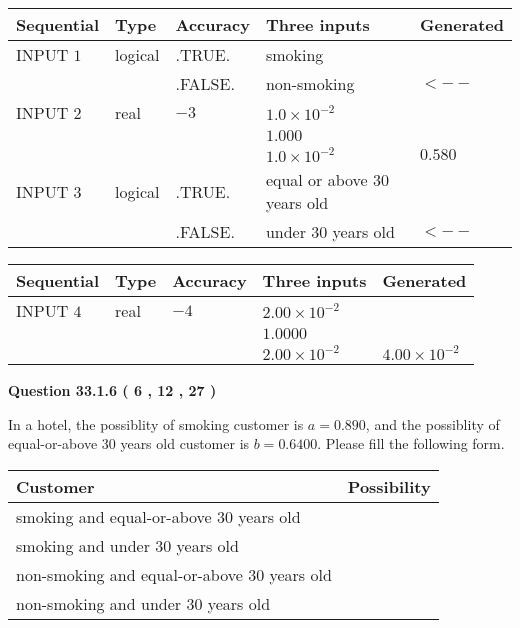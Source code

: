 \documentclass[12pt]{article}
\begin{document}
   
  
  
\noindent\begin{tabular}{|l|l|l|l|l|}
\hline
 Sequential & Type & Accuracy & Three inputs & Generated \\ 
\hline
 
 
  INPUT $            1 $ & logical & .TRUE. & 
 smoking & 
  \\
  & & .FALSE. & 
  non-smoking & 
  $ <-- $ 
 \\  \hline  
 
 
  INPUT $            2 $ & real & $           -3  $ & $
 1.0 \times 10^{-2}
  $ & \\
  & & &  $
 1.000
  $ & \\
  & & &  $
 1.0 \times 10^{-2}
 $ & $ 0.580 $ 
 \\  \hline  
 
 
  INPUT $            3 $ & logical & .TRUE. & 
 equal or above 30 years old & 
  \\
  & & .FALSE. & 
  under 30 years old & 
  $ <-- $ 
 \\  \hline  
 \end{tabular}
   
   
  
  
\noindent\begin{tabular}{|l|l|l|l|l|}
\hline
 Sequential & Type & Accuracy & Three inputs & Generated \\ 
\hline
 
 
  INPUT $            4 $ & real & $           -4  $ & $
 2.00 \times 10^{-2}
  $ & \\
  & & &  $
 1.0000
  $ & \\
  & & &  $
 2.00 \times 10^{-2}
 $ & $ 4.00 \times 10^{-2} $ 
 \\  \hline  
 \end{tabular}
   
   
  
\vspace{0.2in}
  
{\textbf{\Large{Question
33.1.6 
 (           6 ,          12 ,          27 )
}}}
  
  
In a hotel, the possiblity of  %
smoking customer is
$a =  %
0.890$, and the possiblity of  %
equal-or-above 30 years old customer is $ b =  %
0.6400$.
Please fill the following form.
 
\noindent
\begin{tabular}{|l|l|}
\hline
Customer & Possibility \\
\hline
smoking  and   %
equal-or-above 30 years old  & \\
\hline
smoking  and   %
under 30 years old & \\
\hline
 non-smoking and   %
equal-or-above 30 years old  & \\
\hline
 non-smoking and  %
under 30 years old & \\
\hline
\end{tabular}
 
\end{document}
